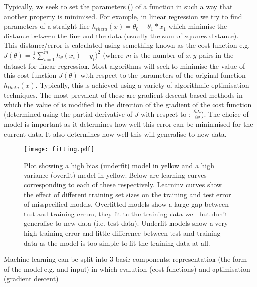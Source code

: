 Typically, we seek to set the parameters (\theta) of a function in such a way
that another property is minimised.  For example, in linear regression we try to find 
parameters of a straight line \(h_{theta}(x) = \theta_{0} + \theta_{1} * x_{1}\) which minimise the distance
between the line and the data (usually the sum of squares distance).
This distance/error is calculated using something known as the cost function e.g. \(J(\theta) = \frac{1}{2} \sum^{m}_{i=1} h_{\theta}(x_{i}) - y_{i})^2\) (where \(m\) is the number of \(x, y\) pairs in the dataset for linear regression.  
Most algorithms will seek to minimise the value of this cost function \(J(\theta)\) with respect to 
the parameters of the original function \(h_{theta}(x)\).  Typically, this is achieved using a variety of algorithmic optimisation techniques.
The most prevalent of these are gradient descent based methods in which the value of \theta is modified 
in the direction of the gradient of the cost function (determined using the partial derivative of \(J\) with respect to \theta: \(\frac{\partial J_{\theta}}{\partial\theta}\)).  
The choice of model is important as it determines how well this error can be mininmised for the current data.
It also determines how well this will generalise to new data.

\begin{figure}[h]
    \texttt{[image: fitting.pdf]}
    \caption{Plot showing a high bias (underfit) model in yellow and a high variance (overfit) model in yellow.
        Below are learning curves corresponding to each of these respectively.
        Learninv curves show the effect of different training set sizes on the training and test error of misspecified models.
        Overfitted models show a large gap between test and training errors, they fit to the training data well but don't generalise
        to new data (i.e. test data).
        Underfit models show a very high training error and little difference between test and training data as the model is too simple
        to fit the training data at all.
    }
    \label{fig:fitting}
\end{figure}


Machine learning can be split into 3 basic components: representation (the form of the model e.g. and input) in which 
evalution (cost functions) and optimisation (gradient descent) \citep{Domingos2012}

